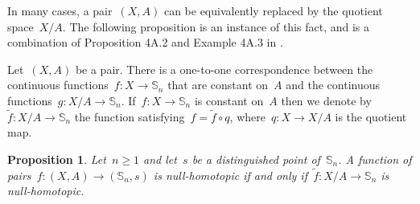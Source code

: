\documentclass[english,11pt]{article}
\theoremstyle{plain}
\newtheorem{proposition}{Proposition}[section]
\theoremstyle{remark}
\theoremstyle{definition}
\newcommand{\Sp}{\mathbb{S}}
\begin{document}
In many cases, a pair~$(X,A)$ can be equivalently replaced by the quotient space~$X/A$. The following proposition is an instance of this fact, and is a combination of Proposition 4A.2 and Example 4A.3 in \cite{Hatcher02}.

Let~$(X,A)$ be a pair. There is a one-to-one correspondence between the continuous functions~$f:X\to \Sp_n$ that are constant on~$A$ and the continuous functions~$g:X/A\to\Sp_n$. If~$f:X\to \Sp_n$ is constant on~$A$ then we denote by~$\widetilde{f}:X/A\to\Sp_n$ the function satisfying~$f=\widetilde{f}\circ q$, where~$q:X\to X/A$ is the quotient map.

\begin{proposition}\label{prop_quotient_pair}
Let~$n\geq 1$ and let~$s$ be a distinguished point of~$\Sp_n$. A function of pairs~$f:(X,A)\to (\Sp_n,s)$ is null-homotopic if and only if~$\widetilde{f}:X/A\to\Sp_n$ is null-homotopic.
\end{proposition}
\end{document}

